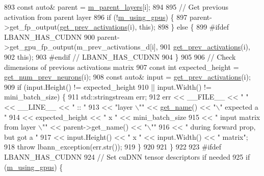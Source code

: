 \begin{DoxyCode}
893     \textcolor{keyword}{const} \textcolor{keyword}{auto}& parent = \hyperlink{classlbann_1_1Layer_a3fa7c6cf1a22bb14ab0e85e3dc6027c5}{m\_parent\_layers}[i];
894 
895     \textcolor{comment}{// Get previous activation from parent layer}
896     \textcolor{keywordflow}{if} (!\hyperlink{classlbann_1_1Layer_af7881cb5eff5207c15fa835d65462e8f}{m\_using\_gpus}) \{
897       parent->get\_fp\_output(\hyperlink{classlbann_1_1Layer_a45853df73a2e72bfaa774665a0f37ed7}{get\_prev\_activations}(i), \textcolor{keyword}{this});
898     \} \textcolor{keywordflow}{else} \{
899 \textcolor{preprocessor}{      #ifdef LBANN\_HAS\_CUDNN}
900       parent->get\_gpu\_fp\_output(m\_prev\_activations\_d[i],
901                                 \hyperlink{classlbann_1_1Layer_a45853df73a2e72bfaa774665a0f37ed7}{get\_prev\_activations}(i),
902                                 \textcolor{keyword}{this});
903 \textcolor{preprocessor}{      #endif // LBANN\_HAS\_CUDNN}
904     \}
905 
906     \textcolor{comment}{// Check dimensions of previous activations matrix}
907     \textcolor{keyword}{const} \textcolor{keywordtype}{int} expected\_height = \hyperlink{classlbann_1_1Layer_a27112eb70bbfbd7f3c3e749960400dec}{get\_num\_prev\_neurons}(i);
908     \textcolor{keyword}{const} \textcolor{keyword}{auto}& input = \hyperlink{classlbann_1_1Layer_a45853df73a2e72bfaa774665a0f37ed7}{get\_prev\_activations}(i);
909     \textcolor{keywordflow}{if} (input.Height() != expected\_height
910         || input.Width() != mini\_batch\_size) \{
911       std::stringstream err;
912       err << \_\_FILE\_\_ << \textcolor{stringliteral}{" "} << \_\_LINE\_\_ << \textcolor{stringliteral}{" :: "}
913           << \textcolor{stringliteral}{"layer \(\backslash\)""} << \hyperlink{classlbann_1_1Layer_a80027550202fa7dbb1dd55fa8a66c84b}{get\_name}() << \textcolor{stringliteral}{"\(\backslash\)" expected a "}
914           << expected\_height << \textcolor{stringliteral}{" x "} << mini\_batch\_size
915           << \textcolor{stringliteral}{" input matrix from layer \(\backslash\)""} << parent->get\_name() << \textcolor{stringliteral}{"\(\backslash\)""}
916           << \textcolor{stringliteral}{" during forward prop, but got a "}
917           << input.Height() << \textcolor{stringliteral}{" x "} << input.Width() << \textcolor{stringliteral}{" matrix"};
918       \textcolor{keywordflow}{throw} lbann\_exception(err.str());
919     \}
920 
921   \}
922 
923 \textcolor{preprocessor}{  #ifdef LBANN\_HAS\_CUDNN}
924   \textcolor{comment}{// Set cuDNN tensor descriptors if needed}
925   \textcolor{keywordflow}{if} (\hyperlink{classlbann_1_1Layer_af7881cb5eff5207c15fa835d65462e8f}{m\_using\_gpus}) \{

\end{DoxyCode}
